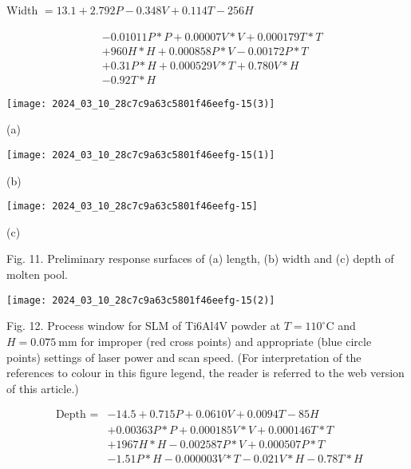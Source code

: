 \documentclass[10pt]{article}
\begin{document}
Width $=13.1+2.792 P-0.348 V+0.114 T-256 H$

$$
\begin{aligned}
& -0.01011 P * P+0.00007 V * V+0.000179 T * T \\
& +960 H * H+0.000858 P * V-0.00172 P * T \\
& +0.31 P * H+0.000529 V * T+0.780 V * H \\
& -0.92 T * H
\end{aligned}
$$

\begin{center}
\texttt{[image: 2024\_03\_10\_28c7c9a63c5801f46eefg-15(3)]}
\end{center}

(a)

\begin{center}
\texttt{[image: 2024\_03\_10\_28c7c9a63c5801f46eefg-15(1)]}
\end{center}

(b)

\begin{center}
\texttt{[image: 2024\_03\_10\_28c7c9a63c5801f46eefg-15]}
\end{center}

(c)

Fig. 11. Preliminary response surfaces of (a) length, (b) width and (c) depth of molten pool.

\begin{center}
\texttt{[image: 2024\_03\_10\_28c7c9a63c5801f46eefg-15(2)]}
\end{center}

Fig. 12. Process window for SLM of Ti6Al4V powder at $T=110^{\circ} \mathrm{C}$ and $H=0.075 \mathrm{~mm}$ for improper (red cross points) and appropriate (blue circle points) settings of laser power and scan speed. (For interpretation of the references to colour in this figure legend, the reader is referred to the web version of this article.)


\begin{align*}
\text { Depth }= & -14.5+0.715 P+0.0610 V+0.0094 T-85 H \\
& +0.00363 P * P+0.000185 V * V+0.000146 T * T \\
& +1967 H * H-0.002587 P * V+0.000507 P * T \\
& -1.51 P * H-0.000003 V * T-0.021 V * H-0.78 T * H \tag{21}
\end{align*}
\end{document}
